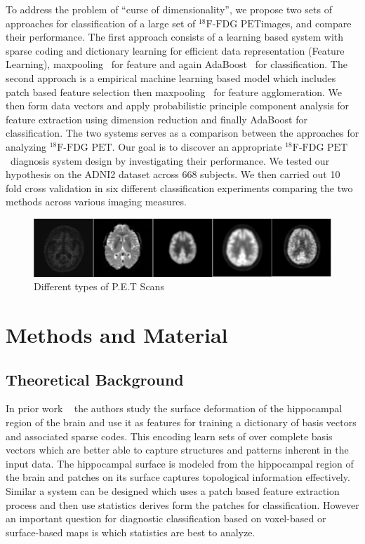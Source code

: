 \documentclass[authoryear,preprint,revi	ew,12pt]{elsarticle}
\newcommand{\FDGPET}   {$ ^{18}\textrm{F-FDG PET} $}
\begin{document}
To address the problem of ``curse of dimensionality'', we propose two sets of approaches for classification of a large set of \FDGPET images, and compare their performance. The first approach consists of a learning based system with sparse coding and dictionary learning for efficient data representation (Feature Learning), maxpooling~\citep{boureau2010theoretical} for feature and again AdaBoost~\citep{rojas2009adaboost} for classification. The second approach is a empirical machine learning based model which includes patch based feature selection then maxpooling~\citep{boureau2010theoretical} for feature agglomeration. We then form data vectors and apply probabilistic principle component analysis for feature extraction using dimension reduction and finally AdaBoost for classification. The two systems serves as a comparison between the approaches for analyzing \FDGPET. Our goal is to discover an appropriate \FDGPET ~diagnosis system design by investigating their performance. We tested our hypothesis on the ADNI2 dataset across $668$ subjects. We then carried out 10 fold cross validation in six different classification experiments comparing the two methods across various imaging measures.

\begin{figure}[h]
	\centering
	\includegraphics[width=\linewidth]{figures/pet_raw.png}
	\caption{Different types of P.E.T Scans}
	\label{fig:pet_raw}
\end{figure}	
	
\section{Methods and Material}

\subsection{Theoretical Background}
\label{subsec:theoritical_background}

In prior work ~\cite{zhang2016applying} the authors study the surface deformation of the hippocampal region of the brain and use it as features for training a dictionary of basis vectors and associated sparse codes. This encoding learn sets of over complete basis vectors which are better able to capture structures and patterns inherent in the input data. The hippocampal surface is modeled from the hippocampal region of the brain and patches on its surface captures topological information effectively. Similar a system can be designed which uses a patch based feature extraction process and then use statistics derives form the patches for classification. However an important question for diagnostic classification based on voxel-based or surface-based maps is which statistics are best to analyze. 
\end{document}
